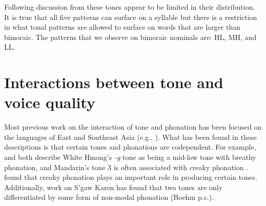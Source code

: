 

Following discussion from \citet{brinkerhoffTonalPatternsTheir2022} these tones appear to be limited in their distribution. It is true that all five patterns can surface on a syllable but there is a restriction in what tonal patterns are allowed to surface on words that are larger than bimoraic. The patterns that we observe on bimoraic nominals are: HL, MH, and LL.

\section{Interactions between tone and voice quality} \label{sec:SLZ-interaction}

Most previous work on the interaction of tone and phonation has been focused on the languages of East and Southeast Asia (e.g., \cite{masicaDefiningLinguisticArea1976,thurgoodVietnameseTonogenesisRevising2002,yipTone2002,enfieldArealLinguisticsMainland2005,michaudComplexTonesEast2012,brunelleTonePhonationSoutheast2016}). What has been found in these descriptions is that certain tones and phonations are codependent. For example, \citet{smalleyProblemsConsonantsTone1976} and \citet{ratliffMeaningfulToneStudy1992} both describe White Hmong's \textit{-g} tone as being a mid-low tone with breathy phonation, and Mandarin's tone 3 is often associated with creaky phonation \citep{hockettPeipingPhonology1947}. \citet{brunelleTonePerceptionNorthern2009} found that creaky phonation plays an important role in producing certain tones. Additionally, work on S'gaw Karen has found that two tones are only differentiated by some form of non-modal phonation (Boehm p.c.). 

